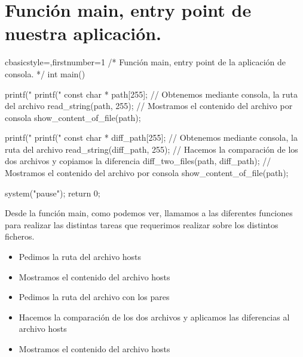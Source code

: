 \section{Función main, entry point de nuestra aplicación.}
	\begin{sourcecodep}[]{c}{basicstyle={\fontsize{12}{12}\selectfont\ttfamily},firstnumber=1}{}
		/*
		Función main, entry point de la aplicación de consola.
		*/
		int main()
		{
			printf("%
			printf("%
			const char * path[255];
			// Obtenemos mediante consola, la ruta del archivo
			read_string(path, 255);
			// Mostramos el contenido del archivo por consola
			show_content_of_file(path);
			
			printf("%
			printf("%
			const char * diff_path[255];
			// Obtenemos mediante consola, la ruta del archivo
			read_string(diff_path, 255);
			// Hacemos la comparación de los dos archivos y copiamos la diferencia
			diff_two_files(path, diff_path);
			// Mostramos el contenido del archivo por consola
			show_content_of_file(path);
			
			system("pause");
			return 0;
		}\end{sourcecodep}
	Desde la función main, como podemos ver, llamamos a las diferentes funciones para realizar las distintas tareas que requerimos realizar sobre los distintos ficheros.
	
	\begin{itemize}
		\item Pedimos la ruta del archivo hosts
		\item Mostramos el contenido del archivo hosts
		\item Pedimos la ruta del archivo con los pares
		\item Hacemos la comparación de los dos archivos y aplicamos las diferencias al archivo hosts
		\item Mostramos el contenido del archivo hosts
	\end{itemize}
\newpage
